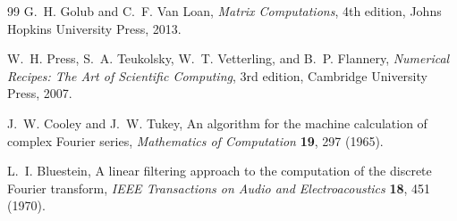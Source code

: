 \begin{thebibliography}{99}
G.~H. Golub and C.~F. Van Loan,
\newblock \emph{Matrix Computations}, 4th edition,
\newblock Johns Hopkins University Press, 2013.

W.~H. Press, S.~A. Teukolsky, W.~T. Vetterling, and B.~P. Flannery,
\newblock \emph{Numerical Recipes: The Art of Scientific Computing},
3rd edition,
\newblock Cambridge University Press, 2007.

J.~W. Cooley and J.~W. Tukey,
\newblock An algorithm for the machine calculation of complex Fourier
series,
\newblock \emph{Mathematics of Computation} \textbf{19}, 297 (1965).

L.~I. Bluestein,
\newblock A linear filtering approach to the computation of the
discrete Fourier transform,
\newblock \emph{IEEE Transactions on Audio and Electroacoustics}
\textbf{18}, 451 (1970).

\end{thebibliography}
